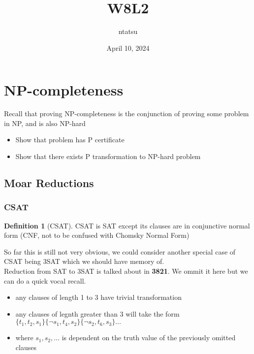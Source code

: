 \documentclass{article}
\title{W8L2}
\author{ntatsu}
\date{April 10, 2024}
\newcommand{\tb}[1]{\textbf{#1}}
\theoremstyle{definition}
\newtheorem{definition}{Definition}[section]
\theoremstyle{remark}
\begin{document}
\maketitle

\section{NP-completeness}

Recall that proving NP-completeness is the conjunction of proving some problem in NP, and is also NP-hard

\begin{itemize}
    \item Show that problem has P certificate
    \item Show that there exists P transformation to NP-hard problem
\end{itemize}

\subsection{Moar Reductions}

\subsubsection*{CSAT}
\begin{definition}[CSAT]
    CSAT is SAT except its clauses are in conjunctive normal form (CNF, not to be confused with Chomsky Normal Form)
\end{definition}

So far this is still not very obvious, we could consider another special case of CSAT being 3SAT which we should have memory of. \\
Reduction from SAT to 3SAT is talked about in \tb{3821}. We ommit it here but we can do a quick vocal recall.
\begin{itemize}
    \item any clauses of length 1 to 3 have trivial transformation
    \item any clauses of legnth greater than 3 will take the form $\{t_1, t_2, s_1\}\{\neg s_1, t_4, s_2\}\{\neg s_2, t_6, s_3\}\dots$
    \item where $s_1, s_2, \dots$ is dependent on the truth value of the previously omitted clauses
\end{itemize}
\end{document}
